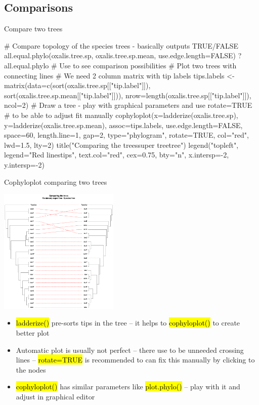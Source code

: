 \documentclass[compress, ucs, xelatex, 11pt, xcolor=svgnames,
  hyperref={
    bookmarks=true,
    unicode=true,
    colorlinks=true,
    pdftitle={Molecular data in R},
    plainpages=false,
    pdfauthor={Vojtech Zeisek},
    pdfsubject={Course about phylogeny and evolution in R},
    pdfcreator={XeLaTeX},
    pdfkeywords={R, evolution, phylogeny, molecular data},
    linkcolor=Tomato,
    anchorcolor=SaddleBrown,
    citecolor=Goldenrod,
    filecolor=DarkMagenta,
    menucolor=Sienna,
    urlcolor=DarkTurquoise,
    pdftex},
  url={hyphens, lowtilde} %
  ]{beamer}
\renewcommand{\texttt}[1]{\hl{\ttfamily #1}}
\begin{document}
\subsection{Comparisons}

\begin{frame}[fragile]{Compare two trees}
  \begin{spluscode}
    # Compare topology of the species trees - basically outputs TRUE/FALSE
    all.equal.phylo(oxalis.tree.sp, oxalis.tree.sp.mean,
      use.edge.length=FALSE)
    ?all.equal.phylo # Use to see comparison possibilities
    # Plot two trees with connecting lines
    # We need 2 column matrix with tip labels
    tips.labels <- matrix(data=c(sort(oxalis.tree.sp[["tip.label"]]),
      sort(oxalis.tree.sp.mean[["tip.label"]])),
      nrow=length(oxalis.tree.sp[["tip.label"]]), ncol=2)
    # Draw a tree - play with graphical parameters and use rotate=TRUE
    # to be able to adjust fit manually
    cophyloplot(x=ladderize(oxalis.tree.sp),
      y=ladderize(oxalis.tree.sp.mean),  assoc=tips.labels,
      use.edge.length=FALSE, space=60, length.line=1, gap=2,
      type="phylogram", rotate=TRUE, col="red", lwd=1.5, lty=2)
    title("Comparing the trees\nParsimony super tree\tSpecies tree")
    legend("topleft", legend="Red lines\nconnect tips", text.col="red",
      cex=0.75, bty="n", x.intersp=-2, y.intersp=-2)
  \end{spluscode}
\end{frame}

\begin{frame}{Cophyloplot comparing two trees}
  \begin{multicols}{2}
    \includegraphics[height=6cm]{cophyloplot.png}
    \begin{itemize}
      \item \texttt{ladderize()} pre-sorts tips in the tree -- it helps to \texttt{cophyloplot()} to create better plot
      \item Automatic plot is usually not perfect -- there use to be unneeded crossing lines -- \texttt{rotate=TRUE} is recommended to can fix this manually by clicking to the nodes
      \item \texttt{cophyloplot()} has similar parameters like \texttt{plot.phylo()} -- play with it and adjust in graphical editor
    \end{itemize}
  \end{multicols}
\end{frame}
\end{document}
